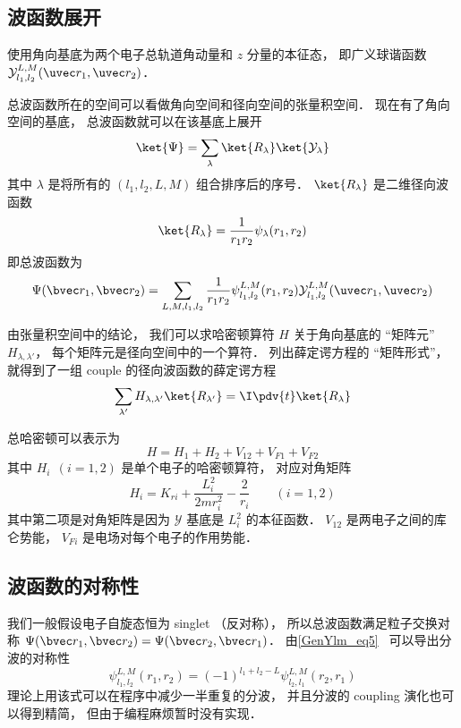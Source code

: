 

\subsection{波函数展开}
使用角向基底为两个电子总轨道角动量和 $z$ 分量的本征态， 即广义球谐函数 $\mathcal{Y}_{l_1,l_2}^{L,M}(\uvec r_1, \uvec r_2)$．

总波函数所在的空间可以看做角向空间和径向空间的张量积空间． 现在有了角向空间的基底， 总波函数就可以在该基底上展开
\begin{equation}
\ket{\Psi} = \sum_\lambda \ket{R_\lambda}\ket{\mathcal{Y_\lambda}}
\end{equation}
其中 $\lambda$ 是将所有的 $(l_1,l_2,L,M)$ 组合排序后的序号． $\ket{R_\lambda}$ 是二维径向波函数
\begin{equation}
\ket{R_\lambda} = \frac{1}{r_1 r_2} \psi_\lambda(r_1, r_2)
\end{equation}
即总波函数为
\begin{equation}\label{HeTDSE_eq2}
\Psi(\bvec r_1, \bvec r_2) = \sum_{L, M, l_1, l_2}  \frac{1}{r_1 r_2} \psi_{l_1, l_2}^{L, M}(r_1, r_2)\mathcal{Y}_{l_1, l_2}^{L, M}(\uvec r_1, \uvec r_2)
\end{equation}

由张量积空间中的结论， 我们可以求哈密顿算符 $H$ 关于角向基底的 “矩阵元” $H_{\lambda, \lambda'}$， 每个矩阵元是径向空间中的一个算符． 列出薛定谔方程的 “矩阵形式”， 就得到了一组 couple 的径向波函数的薛定谔方程
\begin{equation}
\sum_{\lambda'} H_{\lambda, \lambda'} \ket{R_{\lambda'}} = \I \pdv{t} \ket{R_{\lambda}}
\end{equation}

总哈密顿可以表示为
\begin{equation}
H = H_1 + H_2 + V_{12} + V_{F1} + V_{F2}
\end{equation}
其中 $H_i \ \ (i = 1, 2)$ 是单个电子的哈密顿算符， 对应对角矩阵
\begin{equation}
H_i = K_{ri} + \frac{L_i^2}{2m r_i^2} - \frac{2}{r_i} \qquad (i = 1,2)
\end{equation}
其中第二项是对角矩阵是因为 $\mathcal Y$ 基底是 $L_i^2$ 的本征函数． $V_{12}$ 是两电子之间的库仑势能， $V_{Fi}$ 是电场对每个电子的作用势能．

\subsection{波函数的对称性}
我们一般假设电子自旋态恒为 singlet （反对称）， 所以总波函数满足粒子交换对称 $\Psi(\bvec r_1, \bvec r_2) = \Psi(\bvec r_2, \bvec r_1)$． 由\autoref{GenYlm_eq5}~ 可以导出分波的对称性
\begin{equation}\label{HeTDSE_eq1}
\psi_{l_1, l_2}^{L, M}(r_1, r_2) = (-1)^{l_1 + l_2 - L} \psi_{l_2, l_1}^{L, M}(r_2, r_1)
\end{equation}
理论上用该式可以在程序中减少一半重复的分波， 并且分波的 coupling 演化也可以得到精简， 但由于编程麻烦暂时没有实现．

